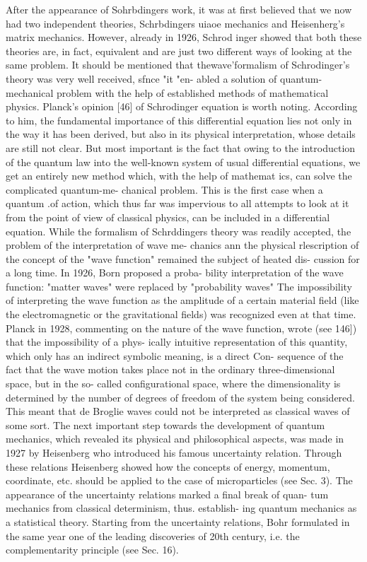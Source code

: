 \documentclass[a4paper,sfsidenotes,colorlinks=true]{tufte-book}
\numberwithin{equation}{section}
\numberwithin{figure}{section}
\begin{document}
{{{{{{After the appearance of Sohrbdingers work, it was at first believed that we now had two independent theories, Schrbdingers uiaoe mechanics and Heisenherg's matrix mechanics. However, already in 1926, Schrod inger showed that both these theories are, in fact, equivalent and are just two different ways of looking at the same problem. It should be mentioned that thewave'formalism of Schrodinger's theory was very well received, sfnce "it "en- abled a solution of quantum-mechanical problem with the help of established methods of mathematical physics. Planck's opinion [46] of Schrodinger equation is worth noting. According to him, the fundamental importance of this differential equation lies not only in the way it has been derived, but also in its physical interpretation, whose details are still not clear. But most important is the fact that owing to the introduction of the quantum law into the well-known system of usual differential equations, we get an entirely new method which, with the help of mathemat ics,	can	solve	the	complicated	quantum-me- chanical problem. This is the first case when a quantum .of action, which thus far was impervious to all attempts to look at it from the point of view of classical physics, can be included in a differential equation.
While the formalism of Schrddingers theory was readily accepted, the problem of the interpretation of wave me- chanics ann the physical rlescription of the concept of the "wave function" remained the subject of heated dis- cussion for a long time. In 1926, Born proposed a proba- bility interpretation of the wave function: "matter waves" were replaced by "probability waves" The impossibility of interpreting the wave function as the amplitude of a
certain material field (like the electromagnetic or the gravitational fields) was recognized even at that time. Planck in 1928, commenting on the nature of the wave function, wrote (see 146]) that the impossibility of a phys- ically intuitive representation of this quantity, which only has an indirect symbolic meaning, is a direct Con- sequence of the fact that the wave motion takes place not in the ordinary three-dimensional space, but in the so- called configurational space, where the dimensionality is determined by the number of degrees of freedom of the system being considered.
This meant that de Broglie waves could not be interpreted as classical waves of some sort. The next important step towards the development of quantum mechanics, which revealed its physical and philosophical aspects, was made in 1927 by Heisenberg who introduced his famous uncertainty relation. Through these relations Heisenberg showed how the concepts of energy, momentum, coordinate, etc. should be applied to the case of microparticles (see Sec. 3). The appearance of the uncertainty relations marked a final break of quan- tum mechanics from classical determinism, thus. establish- ing quantum mechanics as a statistical theory. Starting from the uncertainty relations, Bohr formulated in the same year one of the leading discoveries of 20th century, i.e. the complementarity principle (see Sec. 16).
}}}}}}
\end{document}
